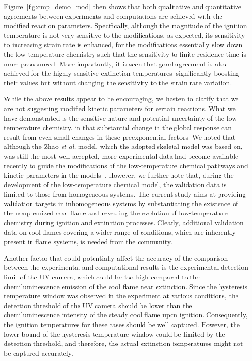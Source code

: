 \documentclass[review,3p,times]{elsarticle}
\begin{document}
Figure~\ref{fig:cmp_demo_mod} then shows that both qualitative and quantitative agreements between experiments and computations are achieved with the modified reaction parameters.  Specifically, although the magnitude of the ignition temperature is not very sensitive to the modifications, as expected, its sensitivity to increasing strain rate is enhanced, for the modifications essentially slow down the low-temperature chemistry such that the sensitivity to finite residence time is more pronounced.  More importantly, it is seen that good agreement is also achieved for the highly sensitive extinction temperatures, significantly boosting their values but without changing the sensitivity to the strain rate variation.

\textcolor{Rev1}{While the above results appear to be encouraging, we hasten to clarify that we are not suggesting modified kinetic parameters for certain reactions. What we have demonstrated is the sensitive nature and potential uncertainty of the low-temperature chemistry, in that substantial change in the global response can result from even small changes in these preexponential factors.}  \textcolor{Rev2}{We noted that although the Zhao \emph{et al.} model, which the adopted skeletal model was based on, was still the most well accepted, more experimental data had become available recently to guide the modifications of the low-temperature chemical pathways and kinetic parameters in the models~\cite{burke15,rodriguez15}.  However, we further note that, during the development of the low-temperature chemical model, the validation data is limited to those from homogeneous systems.  The current study aims at providing validation targets in inhomogeneous systems by substantiating the existence of the nonpremixed cool flame and revealing the evolution of low-temperature chemistry during ignition and extinction processes.  Clearly, additional validation data on cool flames covering a wider range of conditions, which are inherently present in flame systems, is needed from the community.}

Another factor that could potentially affect the accuracy of the comparison between the experimental and computational results is the experimental detection limit of the UV camera, which could be too high compared to the chemiluminescence emission of the cool flame near extinction.  Since the hysteresis temperature window was observed in the experiment at various conditions, the detection threshold of the UV camera should be lower than the chemiluminescence intensity of the steady cool flame upon ignition.  Consequently, the ignition temperatures for these cases should be well captured.  However, the lower bound of the hysteresis temperature window could be limited by the detection threshold, and therefore, the actual extinction temperatures might not be captured accurately.
\end{document}
